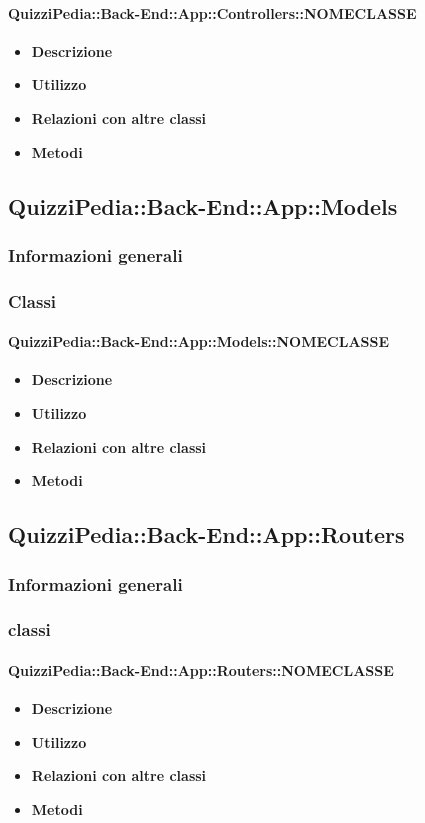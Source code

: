 \paragraph{QuizziPedia::Back-End::App::Controllers::NOMECLASSE}
	\begin{itemize}
		\item \textbf{Descrizione} \\
		\item \textbf{Utilizzo} \\
		\item \textbf{Relazioni con altre classi} \\
		\item \textbf{Metodi} \\
	\end{itemize}


\subsection{QuizziPedia::Back-End::App::Models}
\subsubsection{Informazioni generali}
\subsubsection{Classi}
\paragraph{QuizziPedia::Back-End::App::Models::NOMECLASSE}
\begin{itemize}
	\item \textbf{Descrizione} \\
	\item \textbf{Utilizzo} \\
	\item \textbf{Relazioni con altre classi} \\
	\item \textbf{Metodi} \\
\end{itemize}

\subsection{QuizziPedia::Back-End::App::Routers}
\subsubsection{Informazioni generali}
\subsubsection{classi}
\paragraph{QuizziPedia::Back-End::App::Routers::NOMECLASSE}
	\begin{itemize}
		\item \textbf{Descrizione} \\
		\item \textbf{Utilizzo} \\
		\item \textbf{Relazioni con altre classi} \\
		\item \textbf{Metodi} \\
	\end{itemize}